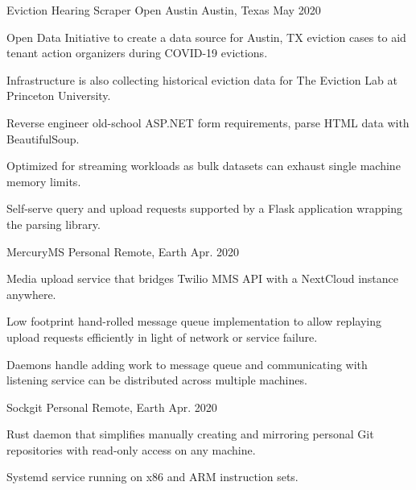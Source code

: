 
\begin{cventries}
	
	\cventry
		{Eviction Hearing Scraper} %
		{Open Austin} %
		{Austin, Texas} %
		{May 2020} %
		{
			\begin{cvitems} %
				\item {Open Data Initiative to create a data source for Austin, TX eviction cases to aid tenant action organizers during COVID-19 evictions.}
				\item {Infrastructure is also collecting historical eviction data for The Eviction Lab at Princeton University.}
				\item {Reverse engineer old-school ASP.NET form requirements, parse HTML data with BeautifulSoup.}
				\item {Optimized for streaming workloads as bulk datasets can exhaust single machine memory limits.}
				\item {Self-serve query and upload requests supported by a Flask application wrapping the parsing library.}
			\end{cvitems}
		}

	\cventry
		{MercuryMS} %
		{Personal} %
		{Remote, Earth} %
		{Apr. 2020} %
		{
			\begin{cvitems} %
				\item {Media upload service that bridges Twilio MMS API with a NextCloud instance anywhere.}
				\item {Low footprint hand-rolled message queue implementation to allow replaying upload requests efficiently in light of network or service failure.}
				\item {Daemons handle adding work to message queue and communicating with listening service can be distributed across multiple machines.}
			\end{cvitems}
		}

	\cventry
		{Sockgit} %
		{Personal} %
		{Remote, Earth} %
		{Apr. 2020} %
		{
			\begin{cvitems} %
				\item {Rust daemon that simplifies manually creating and mirroring personal Git repositories with read-only access on any machine.}
				\item {Systemd service running on x86 and ARM instruction sets.}
			\end{cvitems}
		}


\end{cventries}
